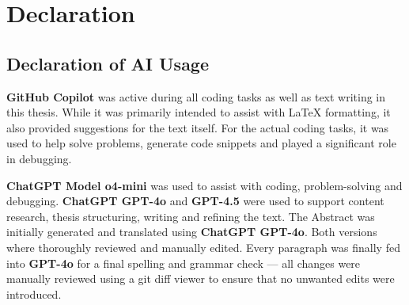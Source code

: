 


\section{Declaration}
\label{declaration}

\subsection{Declaration of AI Usage}%

\textbf{GitHub Copilot} was active during all coding tasks as well as text writing in this thesis.
While it was primarily intended to assist with LaTeX formatting, it also provided suggestions for the text itself.
For the actual coding tasks, it was used to help solve problems, generate code snippets and played a significant role in debugging.

\textbf{ChatGPT Model o4-mini} was used to assist with coding, problem-solving and debugging.
\textbf{ChatGPT GPT-4o} and \textbf{GPT-4.5} were used to support content research, thesis structuring, writing and refining the text.
The Abstract was initially generated and translated using \textbf{ChatGPT GPT-4o}.
Both versions where thoroughly reviewed and manually edited.
Every paragraph was finally fed into \textbf{GPT-4o} for a final spelling and grammar check --- all changes were manually reviewed using a git diff viewer to ensure that no unwanted edits were introduced.

\newpage
{}


